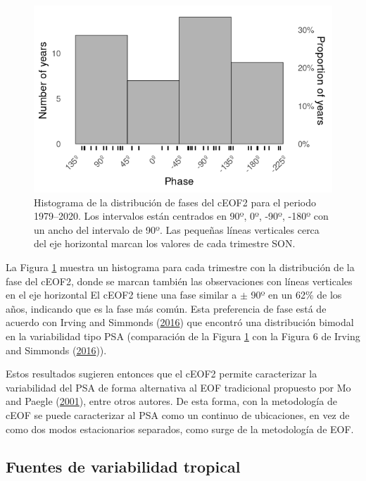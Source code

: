 \documentclass[12pt,oneside,a4paper]{reedthesis}
\begin{document}
\begin{figure}

{\centering \includegraphics{figures/20-ceofs/phase-histogram-1} 

}

\caption{Histograma de la distribución de fases del cEOF2 para el periodo 1979--2020. Los intervalos están centrados en 90º, 0º, -90º, -180º con un ancho del intervalo de 90º. Las pequeñas líneas verticales cerca del eje horizontal marcan los valores de cada trimestre SON.}\label{fig:phase-histogram}
\end{figure}

La Figura \ref{fig:phase-histogram} muestra un histograma para cada trimestre con la distribución de la fase del cEOF2, donde se marcan también las observaciones con líneas verticales en el eje horizontal
El cEOF2 tiene una fase similar a \(\pm\) 90º en un 62\% de los años, indicando que es la fase más común.
Esta preferencia de fase está de acuerdo con Irving and Simmonds (\protect\hyperlink{ref-irving2016}{2016}) que encontró una distribución bimodal en la variabilidad tipo PSA (comparación de la Figura \ref{fig:phase-histogram} con la Figura 6 de Irving and Simmonds (\protect\hyperlink{ref-irving2016}{2016})).

Estos resultados sugieren entonces que el cEOF2 permite caracterizar la variabilidad del PSA de forma alternativa al EOF tradicional propuesto por Mo and Paegle (\protect\hyperlink{ref-mo2001}{2001}), entre otros autores.
De esta forma, con la metodología de cEOF se puede caracterizar al PSA como un continuo de ubicaciones, en vez de como dos modos estacionarios separados, como surge de la metodología de EOF.

\hypertarget{fuentes-ceof}{%
\subsection{Fuentes de variabilidad tropical}\label{fuentes-ceof}}
\end{document}
